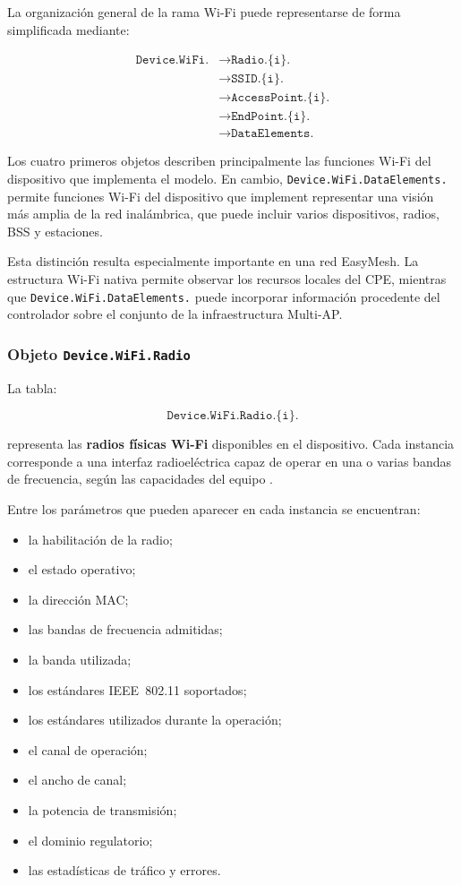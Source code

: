 La organización general de la rama Wi-Fi puede representarse de forma
simplificada mediante:

\[
\begin{aligned}
    \texttt{Device.WiFi.}
    &\longrightarrow \texttt{Radio.\{i\}.}\\
    &\longrightarrow \texttt{SSID.\{i\}.}\\
    &\longrightarrow \texttt{AccessPoint.\{i\}.}\\
    &\longrightarrow \texttt{EndPoint.\{i\}.}\\
    &\longrightarrow \texttt{DataElements.}
\end{aligned}
\]

Los cuatro primeros objetos describen principalmente las funciones Wi-Fi
del dispositivo que implementa el modelo. En cambio,
\texttt{Device.WiFi.DataElements.} permite funciones Wi-Fi
del dispositivo que implement representar una visión más
amplia de la red inalámbrica, que puede incluir varios dispositivos,
radios, BSS y estaciones.

Esta distinción resulta especialmente importante en una red EasyMesh. La
estructura Wi-Fi nativa permite observar los recursos locales del CPE,
mientras que \texttt{Device.WiFi.DataElements.} puede incorporar
información procedente del controlador sobre el conjunto de la
infraestructura Multi-AP.


\subsubsection*{Objeto \texttt{Device.WiFi.Radio}}

La tabla:

\[
    \texttt{Device.WiFi.Radio.\{i\}.}
\]

representa las \textbf{radios físicas Wi-Fi} disponibles en el
dispositivo. Cada instancia corresponde a una interfaz radioeléctrica
capaz de operar en una o varias bandas de frecuencia, según las
capacidades del equipo \cite{bbf_tr181}.

Entre los parámetros que pueden aparecer en cada instancia se encuentran:

\begin{itemize}
    \item la habilitación de la radio;
    \item el estado operativo;
    \item la dirección MAC;
    \item las bandas de frecuencia admitidas;
    \item la banda utilizada;
    \item los estándares IEEE~802.11 soportados;
    \item los estándares utilizados durante la operación;
    \item el canal de operación;
    \item el ancho de canal;
    \item la potencia de transmisión;
    \item el dominio regulatorio;
    \item las estadísticas de tráfico y errores.
\end{itemize}

